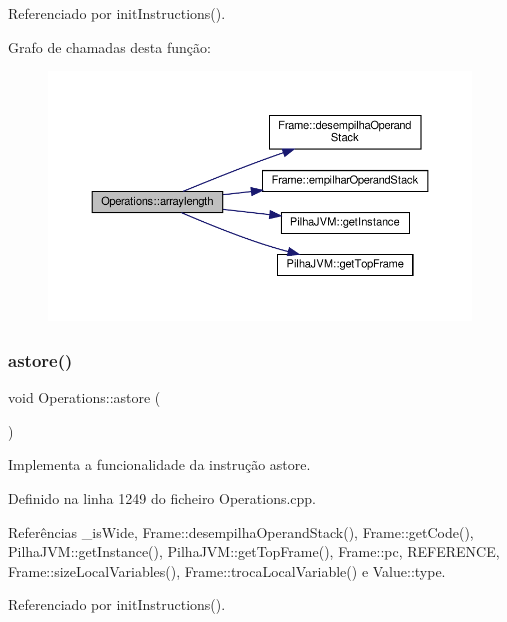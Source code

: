 Referenciado por init\+Instructions().

Grafo de chamadas desta função\+:\nopagebreak
\begin{figure}[H]
\begin{center}
\leavevmode
\includegraphics[width=350pt]{classOperations_ae01c8bce2d6a583151dc0e46d1b8d52f_cgraph}
\end{center}
\end{figure}
\mbox{\label{classOperations_aa414424bd203fb9788712fd2e74c3a32}} 
\subsubsection{\texorpdfstring{astore()}{astore()}}
{\footnotesize\ttfamily void Operations\+::astore (\begin{DoxyParamCaption}{ }\end{DoxyParamCaption})\hspace{0.3cm}{\ttfamily [private]}}



Implementa a funcionalidade da instrução astore. 



Definido na linha 1249 do ficheiro Operations.\+cpp.



Referências \+\_\+is\+Wide, Frame\+::desempilha\+Operand\+Stack(), Frame\+::get\+Code(), Pilha\+J\+V\+M\+::get\+Instance(), Pilha\+J\+V\+M\+::get\+Top\+Frame(), Frame\+::pc, R\+E\+F\+E\+R\+E\+N\+CE, Frame\+::size\+Local\+Variables(), Frame\+::troca\+Local\+Variable() e Value\+::type.



Referenciado por init\+Instructions().

